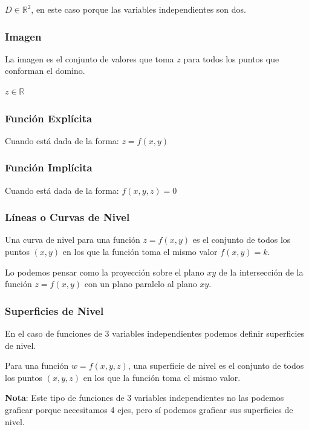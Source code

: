 \documentclass[12pt]{article}
\begin{document}
$ D \in \mathbb{R}^{2} $, en este caso porque las variables independientes son dos.

\subsubsection*{Imagen}
La imagen es el conjunto de valores que toma $ z $ para todos los puntos que conforman el domino.

$ z \in \mathbb{R}^{} $

\subsubsection*{Función Explícita}
Cuando está dada de la forma: $ z = f(x,y) $

\subsubsection*{Función Implícita}
Cuando está dada de la forma: $ f(x,y,z) = 0 $

\subsubsection{Líneas o Curvas de Nivel}
Una curva de nivel para una función $ z = f(x,y) $ es el conjunto de todos los puntos $ (x,y) $ en los que la función toma el mismo valor $ f(x,y)=k $.

Lo podemos pensar como la proyección sobre el plano $ xy $ de la intersección de la función $ z = f(x,y) $ con un plano paralelo al plano $ xy $.

\subsubsection{Superficies de Nivel}
En el caso de funciones de 3 variables independientes podemos definir superficies de nivel.

Para una función $ w = f(x,y,z) $, una superficie de nivel es el conjunto de todos los puntos $ (x,y,z) $ en los que la función toma el mismo valor.

\textbf{Nota}: Este tipo de funciones de 3 variables independientes no las podemos graficar porque necesitamos 4 ejes, pero sí podemos graficar sus superficies de nivel.
\end{document}

